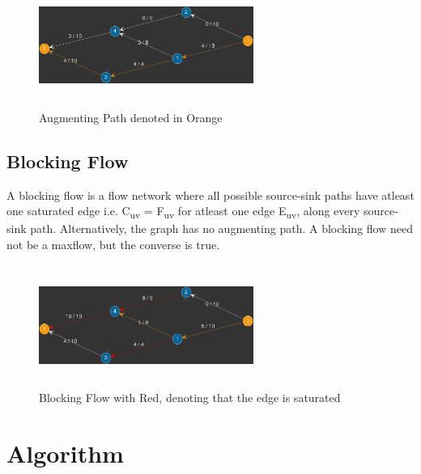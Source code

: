 \documentclass[paper=a4, fontsize=11pt]{scrartcl} %
\numberwithin{equation}{section} %
\numberwithin{figure}{section} %
\numberwithin{table}{section} %
\begin{document}
\begin{figure}[H]
\includegraphics[width=7cm, height=4cm,center]{p8.png}
\caption{Augmenting Path denoted in Orange}
\label{fig:figure2}
\end{figure}



\subsection{Blocking Flow}

A blocking flow is a flow network where all possible source-sink paths have atleast one saturated edge i.e. C\textsubscript{uv} = F\textsubscript{uv} for atleast one edge E\textsubscript{uv}, along every source-sink path. Alternatively, the graph has no augmenting path. A blocking flow need not be a maxflow, but the converse is true.


\begin{figure}[H]
\includegraphics[width=7cm, height=4cm,center]{p9.png}
\caption{ Blocking Flow with Red, denoting that the edge is saturated}
\label{fig:figure2}
\end{figure}




\section{Algorithm}



\end{document}
